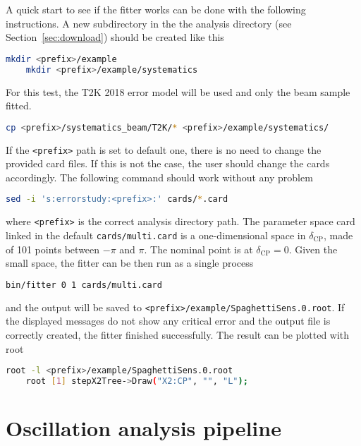 \documentclass[a4paper, 11pt]{article}
\newcommand{\refsec}[1]{Section~\ref{#1}}
\begin{document}
A quick start to see if the fitter works can be done with the following instructions.
A new subdirectory in the the analysis directory (see \refsec{sec:download}) should be created like this
\begin{lstlisting}[language=bash]
    mkdir <prefix>/example
    mkdir <prefix>/example/systematics
\end{lstlisting}
For this test, the T2K 2018 error model will be used and only the beam sample fitted.
\begin{lstlisting}[language=bash]
    cp <prefix>/systematics_beam/T2K/* <prefix>/example/systematics/
\end{lstlisting}
If the \texttt{<prefix>} path is set to default one, there is no need to change the provided card files.  
If this is not the case, the user should change the cards accordingly.
The following command should work without any problem
\begin{lstlisting}[language=bash]
    sed -i 's:errorstudy:<prefix>:' cards/*.card
\end{lstlisting}
where \texttt{<prefix>} is the correct analysis directory path.
The parameter space card linked in the default \texttt{cards/multi.card} is a one-dimensional space in %
$\delta_\text{CP}$, made of 101 points between $-\pi$ and $\pi$.
The nominal point is at $\delta_\text{CP} = 0$.
Given the small space, the fitter can be then run as a single process
\begin{lstlisting}[language=bash]
    bin/fitter 0 1 cards/multi.card
\end{lstlisting}
and the output will be saved to \texttt{<prefix>/example/SpaghettiSens.0.root}.
If the displayed messages do not show any critical error and the output file %
is correctly created, the fitter finished successfully.
The result can be plotted with root
\begin{lstlisting}[language=bash]
    root -l <prefix>/example/SpaghettiSens.0.root
	root [1] stepX2Tree->Draw("X2:CP", "", "L");
\end{lstlisting}

\section{Oscillation analysis pipeline}
\end{document}
